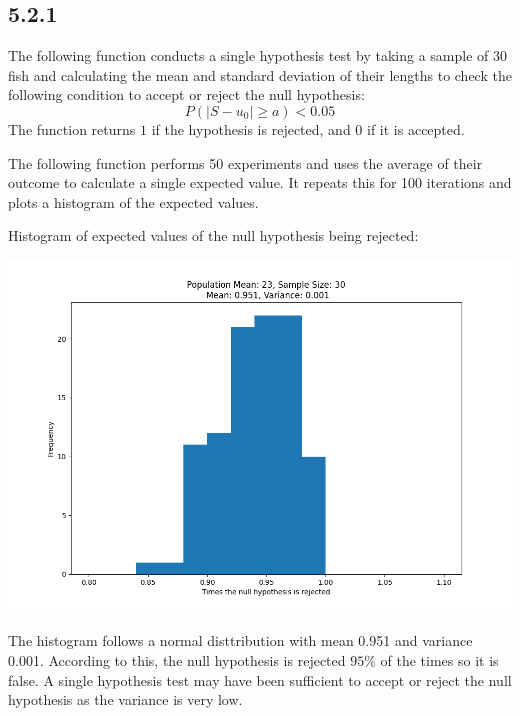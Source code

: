 \documentclass[answers]{exam}
\begin{document}
\subsection*{5.2.1}
The following function conducts a single hypothesis test by taking a sample of $30$ fish and calculating the mean and standard deviation of their lengths to check the following condition to accept or reject the null hypothesis:
\[P(|S - u_0| \geq a) < 0.05\]
The function returns $1$ if the hypothesis is rejected, and $0$ if it is accepted.

The following function performs 50 experiments and uses the average of their outcome to calculate a single expected value. It repeats this for 100 iterations and plots a histogram of the expected values.

Histogram of expected values of the null hypothesis being rejected:
\begin{center}
  \includegraphics[scale = 0.5]{Q5_histograms/Q5.2.1.png}
\end{center}
The histogram follows a normal disttribution with mean 0.951 and variance 0.001. According to this, the null hypothesis is rejected $95\%$ of the times so it is false. A single hypothesis test may have been sufficient to accept or reject the null hypothesis as the variance is very low.
\end{document}

